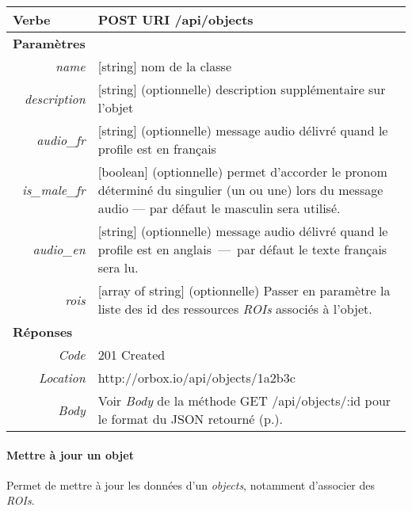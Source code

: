 \begin{appendices}
\begin{absolutelynopagebreak}
\begin{tabular}{@{}p{2cm}p{11.5cm}@{}}
    \toprule
    \textbf{Verbe}                        & POST \hspace{2.5cm} \textbf{URI} \hspace{0.25cm} /api/objects   \\ \midrule
    \textbf{Paramètres}                   &        \\
    \multicolumn{1}{r}{\textit{name}} & [string] nom de la classe  \\ 
    \multicolumn{1}{r}{\textit{description}} & [string] (optionnelle) description supplémentaire sur l'objet  \\ 
    \multicolumn{1}{r}{\textit{audio\_fr}} & [string]  (optionnelle) message audio délivré quand le profile est en français \\ 
    \multicolumn{1}{r}{\textit{is\_male\_fr}} & [boolean] (optionnelle) permet d'accorder le pronom déterminé du singulier (un ou une) lors du message audio --- par défaut le masculin sera utilisé.   \\
    \multicolumn{1}{r}{\textit{audio\_en}} & [string] (optionnelle) message audio délivré quand le profile est en anglais~---~par défaut le texte français sera lu.  \\
    \multicolumn{1}{r}{\textit{rois}} & [array of string] (optionnelle) Passer en paramètre la liste des id des ressources \emph{ROIs} associés à l'objet. \\ \midrule
    \textbf{Réponses}                     &        \\
    \multicolumn{1}{r}{\textit{Code}}   & 201 Created \\
    \multicolumn{1}{r}{\textit{Location}}   & http://orbox.io/api/objects/1a2b3c \\\multicolumn{1}{r}{\textit{Body}}   & Voir \emph{Body} de la méthode GET /api/objects/:id pour le format du JSON retourné (p.\pageref{jsonHalObjects}). \\ \bottomrule
\end{tabular}
\end{absolutelynopagebreak}

\begin{absolutelynopagebreak}
\paragraph{Mettre à jour un objet}

Permet de mettre à jour les données d'un \emph{objects}, notamment d'associer des \emph{ROIs}.


\end{absolutelynopagebreak}
\end{appendices}
